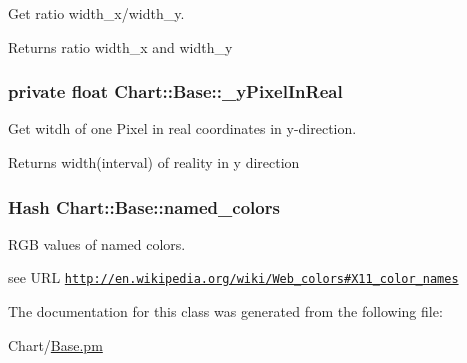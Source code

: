 Get ratio width\_\-x/width\_\-y. 

\begin{DoxyReturn}{Returns}
ratio width\_\-x and width\_\-y 
\end{DoxyReturn}
\hypertarget{classChart_1_1Base_afe24ee8f28c900069e65ddd666a242ff}{
\subsubsection[{\_\-yPixelInReal}]{\setlength{\rightskip}{0pt plus 5cm}private float {\bf Chart::Base::\_\-yPixelInReal}}}
\label{classChart_1_1Base_afe24ee8f28c900069e65ddd666a242ff}


Get witdh of one Pixel in real coordinates in y-\/direction. 

\begin{DoxyReturn}{Returns}
width(interval) of reality in y direction 
\end{DoxyReturn}
\hypertarget{classChart_1_1Base_a38c2792df08724efa7c4e1b9194cbe6e}{
\subsubsection[{named\_\-colors}]{\setlength{\rightskip}{0pt plus 5cm}Hash {\bf Chart::Base::named\_\-colors}}}
\label{classChart_1_1Base_a38c2792df08724efa7c4e1b9194cbe6e}


RGB values of named colors. 

see URL \href{http://en.wikipedia.org/wiki/Web_colors#X11_color_names}{\tt http://en.wikipedia.org/wiki/Web\_\-colors\#X11\_\-color\_\-names} 

The documentation for this class was generated from the following file:\begin{DoxyCompactItemize}
\item 
Chart/\hyperlink{Base_8pm}{Base.pm}\end{DoxyCompactItemize}
